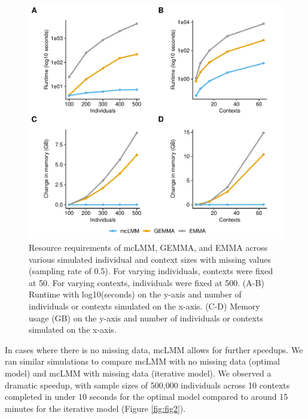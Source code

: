         \begin{figure}
            \centering
            \includegraphics[width=\textwidth]{chapter3/figures/Figure_1.pdf}
            \caption{Resource requirements of mcLMM, GEMMA, and EMMA across various simulated individual and context sizes with missing values (sampling rate of 0.5). For varying individuals, contexts were fixed at 50. For varying contexts, individuals were fixed at 500. (A-B) Runtime with log10(seconds) on the y-axis and number of individuals or contexts simulated on the x-axis. (C-D) Memory usage (GB) on the y-axis and number of individuals or contexts simulated on the x-axis. }
            \label{fig:fig1}
        \end{figure}
        
        In cases where there is no missing data, mcLMM allows for further speedups. We ran similar simulations to compare mcLMM with no missing data (optimal model) and mcLMM with missing data (iterative model). We observed a dramatic speedup, with sample sizes of 500,000 individuals across 10 contexts completed in under 10 seconds for the optimal model compared to around 15 minutes for the iterative model (Figure \ref{fig:fig2}).
        
